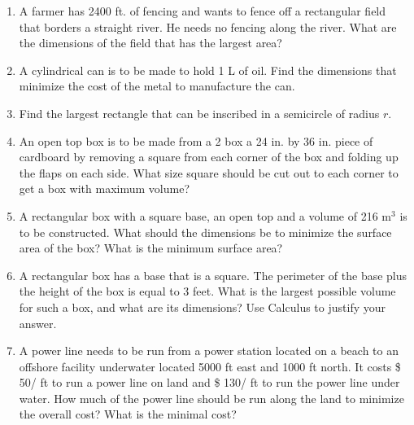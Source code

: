 \documentclass[12pt]{article}
\begin{document}
 
\begin{enumerate}
\item A farmer has 2400 ft. of fencing and wants to fence off a rectangular field that borders a straight river. He needs no fencing along the river. What are the dimensions of the field that has the largest area?

\pagebreak

\item A cylindrical can is to be made to hold 1 L of oil. Find the dimensions that minimize the cost of the metal to manufacture the can.

\pagebreak
\item Find the largest rectangle that can be inscribed in a semicircle of radius $r$.

\pagebreak
\item An open top box is to be made from a 2 box a 24 in. by 36 in. piece of cardboard by removing a square from each corner of the box and folding up the flaps on each side. What size square should be cut out to each corner to get a box with maximum volume?

\pagebreak
\item A rectangular box with a square base, an open top and a volume of 216 $\text{m}^3$ is to be constructed. What should the dimensions be to minimize the surface area of the box? What is the minimum surface area?

\pagebreak
\item A rectangular box has a base that is a square. The perimeter of the base plus the height of the box is equal to 3 feet. What is the largest possible volume for such a box, and what are its dimensions? Use Calculus to justify your answer.

\pagebreak
\item A power line needs to be run from a power station located on a beach to an offshore facility underwater located 5000 ft east and 1000 ft north. It costs \$ 50/ ft to run a power line on land and \$ 130/ ft to run the power line under water. How much of the power line should be run along the land to minimize the overall cost? What is the minimal cost?
\end{enumerate}
\end{document}
